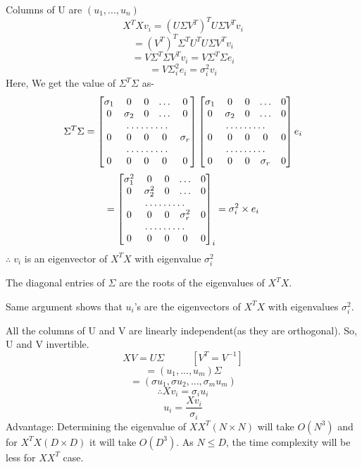 \documentclass[a4paper,11pt]{article}
\begin{document}
\begin{mlsolution}
Columns of U are $(u_1,...,u_n)$
$$X^TXv_i = (U\Sigma V^T)^TU\Sigma V^Tv_i$$
$$=(V^T)^T \Sigma^T U^TU\Sigma V^T v_i$$
$$=V\Sigma^T \Sigma V^Tv_i =V\Sigma^T\Sigma e_i$$
$$=V\Sigma_i^2e_i = \sigma_i^2v_i$$
Here, We get the value of $\Sigma^T \Sigma$ as-
$$\Sigma^T\Sigma=\begin{bmatrix}
    \sigma_1       & 0 & 0 & \dots & 0 \\
    0       & \sigma_2 & 0 & \dots & 0 \\
    \hdotsfor{5} \\
    0       & 0 & 0 & 0 & \sigma_r \\
        \hdotsfor{5} \\
	0       & 0 & 0 & 0 & 0
\end{bmatrix}
\begin{bmatrix}
    \sigma_1       & 0 & 0 & \dots & 0 \\
    0       & \sigma_2 & 0 & \dots & 0 \\
    \hdotsfor{5} \\
    0       & 0 & 0 & 0 & 0 \\
        \hdotsfor{5} \\
	0       & 0 & 0 & \sigma_r & 0
\end{bmatrix} e_i$$
$$=\begin{bmatrix}
    \sigma_1^2       & 0 & 0 & \dots & 0 \\
    0       & \sigma_2^2 & 0 & \dots & 0 \\
    \hdotsfor{5} \\
    0       & 0 & 0 & \sigma_r^2 & 0 \\
        \hdotsfor{5} \\
	0       & 0 & 0 & 0 & 0
\end{bmatrix}_i = \sigma^2_i \times e_i$$
$\therefore\; v_i$ is an eigenvector of $X^TX$ with eigenvalue $\sigma_i^2$

The diagonal entries of $\Sigma$ are the roots of the eigenvalues of $X^TX $.

Same argument shows that $u_i$'s are the eigenvectors of $X^TX$ with eigenvalues $\sigma_i^2$. 

All the columns of U and V are linearly independent(as they are orthogonal). So, U and V invertible.
$$XV = U\Sigma\;\;\;\;\;\;\;\;\;\;[V^T = V^{-1}]$$
$$=(u_1,...,u_m)\Sigma$$
$$=(\sigma u_1,\sigma u_2,...,\sigma_m u_m)$$
$$\therefore Xv_i = \sigma_i u_i $$
$$\boxed{ u_i=\frac{Xv_i}{\sigma_i}}$$
\color{blue}Advantage: \color{black}
Determining the eigenvalue of $XX^T(N\times N)$ will take $O(N^3)$ and for $X^TX (D \times D)$ it will take $O(D^3)$. As $N \leq D$, the time complexity will be less for $XX^T$
case.
\end{mlsolution}
\end{document}
